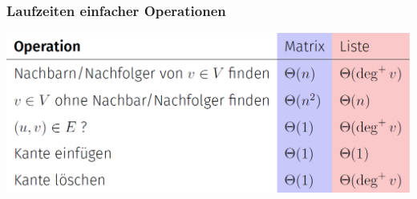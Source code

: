 \begin{sectionbox}
\subsubsection{Laufzeiten einfacher Operationen}\par\smallskip
\begin{center}
    \includegraphics[width = \columnwidth]{../img/AdjLaufzeiten.png}
\end{center}\smallskip
\end{sectionbox}

\vspace{150px}

